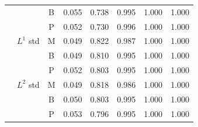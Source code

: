\begin{tabular*}{\textwidth}{@{\extracolsep\fill}
l
>{\raggedright\arraybackslash}p{3.2cm}
c
*{5}{S[table-format=1.3]}
@{}}
 &  & B & 0.055 & 0.738 & 0.995 & 1.000 & 1.000 \\
 &  & P & 0.052 & 0.730 & 0.996 & 1.000 & 1.000 \\
 & $L^{1}$ std & M & 0.049 & 0.822 & 0.987 & 1.000 & 1.000 \\
 &  & B & 0.049 & 0.810 & 0.995 & 1.000 & 1.000 \\
 &  & P & 0.052 & 0.803 & 0.995 & 1.000 & 1.000 \\
 & $L^{2}$ std & M & 0.049 & 0.818 & 0.986 & 1.000 & 1.000 \\
 &  & B & 0.050 & 0.803 & 0.995 & 1.000 & 1.000 \\
 &  & P & 0.053 & 0.796 & 0.995 & 1.000 & 1.000 \\
\bottomrule
\end{tabular*}
